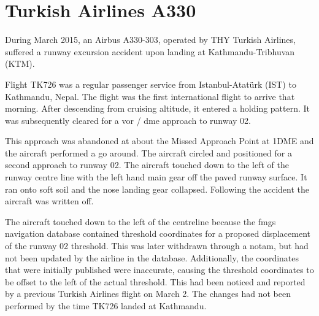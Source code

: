 \section{Turkish Airlines A330} \label{bkm:accinc:turkisha330}
During March 2015, an Airbus A330-303, operated by THY Turkish Airlines, suffered a runway excursion accident upon landing at Kathmandu-Tribhuvan (KTM).

Flight TK726 was a regular passenger service from Istanbul-Atat{\"u}rk (IST) to Kathmandu, Nepal. The flight was the first international flight to arrive that morning. After descending from cruising altitude, it entered a holding pattern. It was subsequently cleared for a \gls{vor} / \gls{dme} approach to runway 02. 

This approach was abandoned at about the Missed Approach Point at 1DME and the aircraft performed a go around. The aircraft circled and positioned for a second approach to runway 02. The aircraft touched down to the left of the runway centre line with the left hand main gear off the paved runway surface. It ran onto soft soil and the nose landing gear collapsed. Following the accident the aircraft was written off.

The aircraft touched down to the left of the centreline because the \gls{fmgs} navigation \gls{database} contained threshold coordinates for a proposed displacement of the runway 02 threshold. This was later withdrawn through a \gls{notam}, but had not been updated by the airline in the \gls{database}. Additionally, the coordinates that were initially published were inaccurate, causing the threshold coordinates to be offset to the left of the actual threshold. This had been noticed and reported by a previous Turkish Airlines flight on March 2. The changes had not been performed by the time TK726 landed at Kathmandu. 

